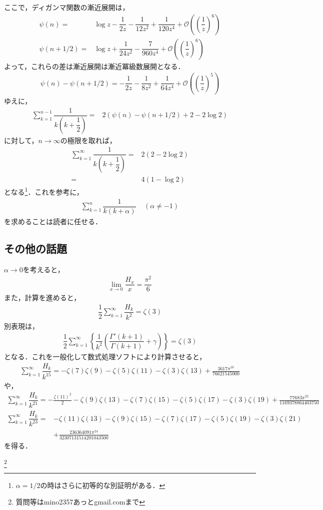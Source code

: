 \documentclass[12pt]{jsarticle}
\begin{document}
ここで，ディガンマ関数の漸近展開は，
\begin{align*}
\psi(n) =& \log z - \dfrac{1}{2z} - \dfrac{1}{12z^2} + \dfrac{1}{120z^4} + \mathcal{O}\left( \left( \dfrac{1}{z} \right)^6 \right) \\
\psi(n+1/2) =& \log z + \dfrac{1}{24z^2} - \dfrac{7}{960z^4} + \mathcal{O}\left( \left( \dfrac{1}{z} \right)^6 \right)
\end{align*}
よって，これらの差は漸近展開は漸近冪級数展開となる．
\begin{align*}
\psi(n) - \psi(n+1/2) = - \dfrac{1}{2z} - \dfrac{1}{8z^2} + \dfrac{1}{64z^4} + \mathcal{O}\left( \left( \dfrac{1}{z} \right)^5 \right)
\end{align*}
ゆえに，
\begin{align*}
\sum_{k=1}^{n-1}\dfrac{1}{k\left(k+\dfrac{1}{2}\right)} =& 2 \left( \psi(n) - \psi\left( n + 1/2 \right) + 2 - 2\log 2 \right)
\end{align*}
に対して，$n \to \infty$の極限を取れば，
\begin{align*}
\sum_{k=1}^{\infty}\dfrac{1}{k\left(k+\dfrac{1}{2}\right)} =& 2 \left( 2 - 2\log 2 \right) \\
=& 4(1 - \log 2)
\end{align*}
となる\footnote{$\alpha=1/2$の時はさらに初等的な別証明がある．}．これを参考に，
\begin{align*}
\sum_{k=1}^{n} \dfrac{1}{k(k+\alpha)} \ \ \ \ \ (\alpha \neq -1)
\end{align*}
を求めることは読者に任せる．
\subsection*{その他の話題}
$\alpha \to 0$を考えると，
\begin{align*}
\lim_{x \to 0}\dfrac{H_{x}}{x} = \dfrac{\pi^2}{6}
\end{align*}
また，計算を進めると，
\begin{align*}
\dfrac{1}{2}\sum_{k=1}^{\infty}\dfrac{H_{k}}{k^2} = \zeta(3)
\end{align*}
別表現は，
\begin{align*}
\dfrac{1}{2}\sum_{k=1}^{\infty} \left\{ \dfrac{1}{k^2}\left( \dfrac{\Gamma'(k+1)}{\Gamma(k+1)} + \gamma \right) \right\} = \zeta(3)
\end{align*}
となる．これを一般化して数式処理ソフトにより計算させると，
\begin{align*}
\sum_{k=1}^{\infty}\dfrac{H_{k}}{k^{15}}=-\zeta (7) \zeta (9)-\zeta (5) \zeta (11)-\zeta (3) \zeta(13)+\frac{3617 \pi ^{16}}{76621545000}
\end{align*}
や，
\begin{align*}
\sum_{k=1}^{\infty}\dfrac{H_{k}}{k^{21}}=-\frac{\zeta (11)^2}{2}-\zeta (9) \zeta (13)-\zeta (7) \zeta (15)-\zeta (5) \zeta(17)-\zeta (3) \zeta (19)+\frac{77683 \pi ^{22}}{1169378864403750}
\end{align*}
\begin{align*}
\sum_{k=1}^{\infty}\dfrac{H_{k}}{k^{23}}=&-\zeta (11) \zeta (13)-\zeta (9) \zeta (15)-\zeta (7) \zeta (17)-\zeta (5) \zeta(19)-\zeta (3) \zeta (21) \\
&+\frac{236364091 \pi ^{24}}{32307131514201043500}
\end{align*}
を得る．

\footnote[0]{
質問等はmino2357あっとgmail.comまで
}

\thispagestyle{empty}
\end{document}
